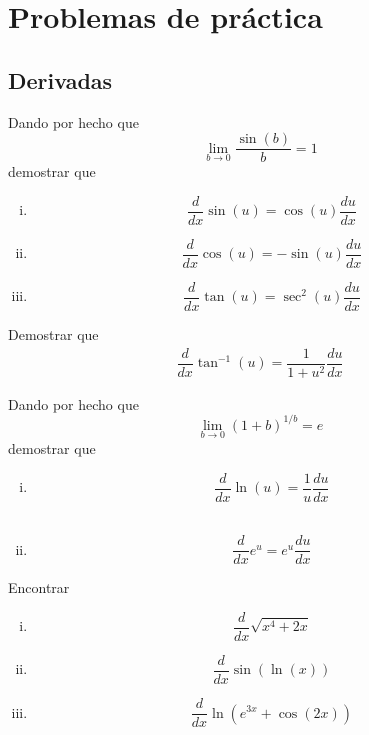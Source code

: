 \section{Problemas de práctica}

\subsection{Derivadas}

\begin{problema}
	Dando por hecho que \[\lim_{b\to 0}\dfrac{\sin(b)}{b}=1\] demostrar que
	\begin{enumerate}[(i)]
		\item \[\dfrac{d}{dx}\sin(u)=\cos(u)\dfrac{du}{dx}\]
		\item \[\dfrac{d}{dx}\cos(u)=-\sin(u)\dfrac{du}{dx}\]
		\item \[\dfrac{d}{dx}\tan(u)=\sec^{2}(u)\dfrac{du}{dx}\]

	\end{enumerate}
\end{problema}



{}
\begin{problema}

	Demostrar que
	\begin{align}
		\dfrac{d}{dx}\tan^{-1}\left( u \right) =
		\dfrac{1}{1+u^{2}}\dfrac{du}{dx}
	\end{align}
\end{problema}



{}
\begin{problema}
	Dando por hecho que \[\lim_{b\to 0}\left( 1+b \right)^{1/b}=e\] demostrar que
	\begin{enumerate}[(i)]
		\item \[\dfrac{d}{dx}\ln(u)=\dfrac{1}{u}\dfrac{du}{dx}\] \\

		\item \[\dfrac{d}{dx}e^{u}= e^{u}\dfrac{du}{dx}\]
	\end{enumerate}
\end{problema}



{}
\begin{problema}
	Encontrar
	\begin{enumerate}[(i)]
		\item \[\dfrac{d}{dx}\sqrt{x^{4}+2x}\]

		\item \[\dfrac{d}{dx}\sin\left( \ln(x) \right)\]

		\item \[\dfrac{d}{dx}\ln\left( e^{3x}+ \cos\left( 2x \right) \right)\]
	\end{enumerate}
\end{problema}



